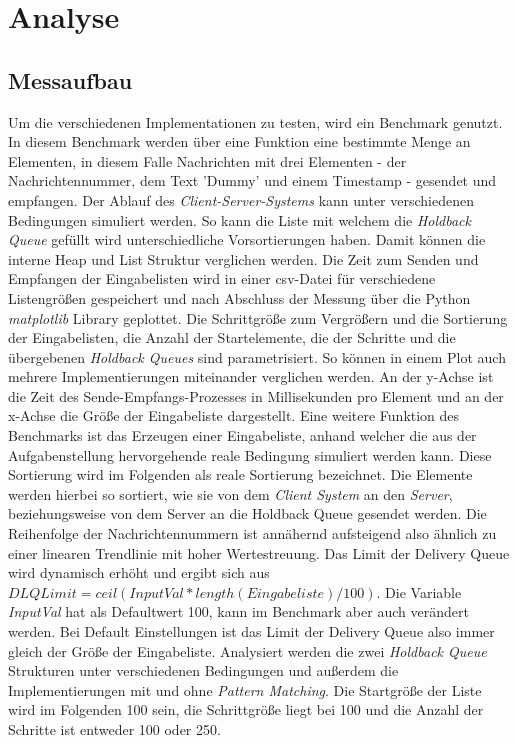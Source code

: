 \section{Analyse}

\subsection{Messaufbau}

Um die verschiedenen Implementationen zu testen, wird ein Benchmark genutzt. In diesem Benchmark werden über eine Funktion eine bestimmte Menge an Elementen, in diesem Falle Nachrichten mit drei Elementen - der Nachrichtennummer, dem Text 'Dummy' und einem Timestamp - gesendet und empfangen. Der Ablauf des \textit{Client-Server-Systems} kann unter verschiedenen Bedingungen simuliert werden. 
So kann die Liste mit welchem die \textit{Holdback Queue} gefüllt wird unterschiedliche Vorsortierungen haben. Damit können die interne Heap und List Struktur verglichen werden.
Die Zeit zum Senden und Empfangen der Eingabelisten wird in einer csv-Datei für verschiedene Listengrößen gespeichert und nach Abschluss der Messung über die Python \textit{matplotlib} Library geplottet.
Die Schrittgröße zum Vergrößern und die Sortierung der Eingabelisten, die Anzahl der Startelemente, die der Schritte und die übergebenen \textit{Holdback Queues} sind parametrisiert. So können in einem Plot auch mehrere Implementierungen miteinander verglichen werden. An der y-Achse ist die Zeit des Sende-Empfangs-Prozesses in Millisekunden pro Element und an der x-Achse die Größe der Eingabeliste dargestellt. 
Eine weitere Funktion des Benchmarks ist das Erzeugen einer Eingabeliste, anhand welcher die aus der Aufgabenstellung hervorgehende reale Bedingung simuliert werden kann. Diese Sortierung wird im Folgenden als reale Sortierung bezeichnet. Die Elemente werden hierbei so sortiert, wie sie von dem \textit{Client System} an den \textit{Server}, beziehungsweise von dem Server an die Holdback Queue gesendet werden. Die Reihenfolge der Nachrichtennummern ist annähernd aufsteigend also ähnlich zu einer linearen Trendlinie mit hoher Wertestreuung. 
Das Limit der Delivery Queue wird dynamisch erhöht und ergibt sich aus $DLQLimit = ceil(InputVal * length(Eingabeliste) / 100)$. Die Variable \textit{InputVal} hat als Defaultwert 100, kann im Benchmark aber auch verändert werden. Bei Default Einstellungen ist das Limit der Delivery Queue also immer gleich der Größe der Eingabeliste. 
Analysiert werden die zwei \textit{Holdback Queue} Strukturen unter verschiedenen Bedingungen und außerdem die Implementierungen mit und ohne \textit{Pattern Matching}. 
Die Startgröße der Liste wird im Folgenden 100 sein, die Schrittgröße liegt bei 100 und die Anzahl der Schritte ist entweder 100 oder 250.

